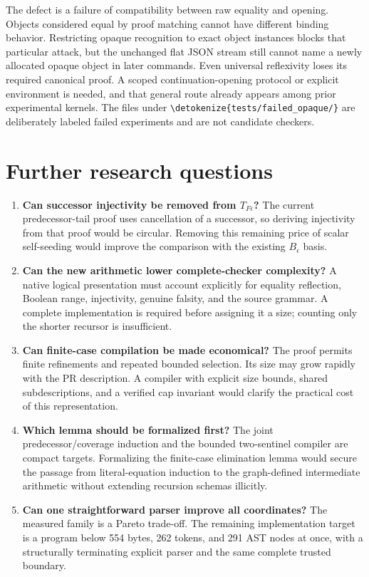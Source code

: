 \documentclass[11pt,letterpaper]{article}
\theoremstyle{definition}\newtheorem{definition}[theorem]{Definition}
\theoremstyle{remark}\newtheorem{remark}[theorem]{Remark}
\newcommand{\TF}{T_{F\epsilon}}
\newcommand{\file}[1]{\expandafter\nolinkurl\expandafter{\detokenize{#1}}}
\begin{document}
The defect is a failure of compatibility between raw equality and
opening. Objects considered equal by proof matching cannot have
different binding behavior. Restricting opaque recognition to exact
object instances blocks that particular attack, but the unchanged flat
JSON stream still cannot name a newly allocated opaque object in later
commands. Even universal reflexivity loses its required canonical
proof. A scoped continuation-opening protocol or explicit environment
is needed, and that general route already appears among prior
experimental kernels. The files under \file{tests/failed_opaque/} are
deliberately labeled failed experiments and are not candidate checkers.

\section{Further research questions}
\begin{enumerate}
\item \textbf{Can successor injectivity be removed from $\TF$?}
The current predecessor-tail proof uses cancellation of a successor,
so deriving injectivity from that proof would be circular. Removing
this remaining price of scalar self-seeding would improve the
comparison with the existing $B_\epsilon$ basis.
\item \textbf{Can the new arithmetic lower complete-checker complexity?}
A native logical presentation must account explicitly for equality
reflection, Boolean range, injectivity, genuine falsity, and the
source grammar. A complete implementation is required before assigning
it a size; counting only the shorter recursor is insufficient.
\item \textbf{Can finite-case compilation be made economical?}
The proof permits finite refinements and repeated bounded selection.
Its size may grow rapidly with the PR description. A compiler with
explicit size bounds, shared subdescriptions, and a verified cap
invariant would clarify the practical cost of this representation.
\item \textbf{Which lemma should be formalized first?}
The joint predecessor/coverage induction and the bounded two-sentinel
compiler are compact targets. Formalizing the finite-case elimination
lemma would secure the passage from literal-equation induction to the
graph-defined intermediate arithmetic without extending recursion
schemas illicitly.
\item \textbf{Can one straightforward parser improve all coordinates?}
The measured family is a Pareto trade-off. The remaining implementation
target is a program below 554 bytes, 262 tokens, and 291 AST nodes at
once, with a structurally terminating explicit parser and the same
complete trusted boundary.
\end{enumerate}
\end{document}
